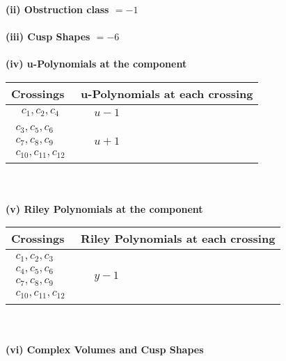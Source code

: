 \documentclass[1p]{elsarticle_modified}
\theoremstyle{definition}
\begin{document}
\flushleft \textbf{(ii) Obstruction class $= -1$}\\~\\
\flushleft \textbf{(iii) Cusp Shapes $= -6$}\\~\\
\newpage\renewcommand{\arraystretch}{1}
\flushleft \textbf{(iv) u-Polynomials at the component}\newline \\
\begin{tabular}{m{50pt}|m{274pt}}
Crossings & \hspace{64pt}u-Polynomials at each crossing \\
\hline $$\begin{aligned}c_{1},c_{2},c_{4}\end{aligned}$$&$\begin{aligned}
&u-1
\end{aligned}$\\
\hline $$\begin{aligned}c_{3},c_{5},c_{6}\\c_{7},c_{8},c_{9}\\c_{10},c_{11},c_{12}\end{aligned}$$&$\begin{aligned}
&u+1
\end{aligned}$\\
\hline
\end{tabular}\\~\\
\newpage\renewcommand{\arraystretch}{1}
\flushleft \textbf{(v) Riley Polynomials at the component}\newline \\
\begin{tabular}{m{50pt}|m{274pt}}
Crossings & \hspace{64pt}Riley Polynomials at each crossing \\
\hline $$\begin{aligned}c_{1},c_{2},c_{3}\\c_{4},c_{5},c_{6}\\c_{7},c_{8},c_{9}\\c_{10},c_{11},c_{12}\end{aligned}$$&$\begin{aligned}
&y-1
\end{aligned}$\\
\hline
\end{tabular}\\~\\
\newpage\flushleft \textbf{(vi) Complex Volumes and Cusp Shapes}
\end{document}
